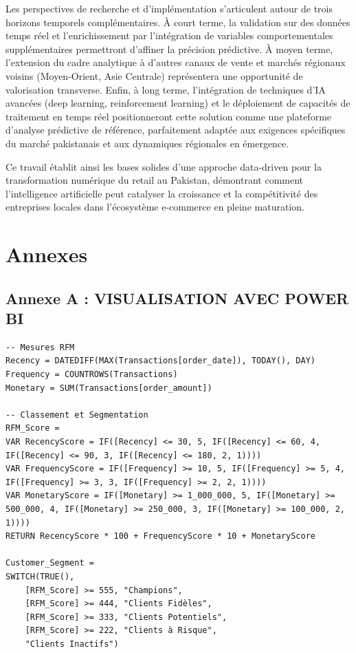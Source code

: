 \documentclass[a4paper,12pt]{article}
\begin{document}
Les perspectives de recherche et d'implémentation s'articulent autour de trois horizons temporels complémentaires. À court terme, la validation sur des données temps réel et l'enrichissement par l'intégration de variables comportementales supplémentaires permettront d'affiner la précision prédictive. À moyen terme, l'extension du cadre analytique à d'autres canaux de vente et marchés régionaux voisins (Moyen-Orient, Asie Centrale) représentera une opportunité de valorisation transverse. Enfin, à long terme, l'intégration de techniques d'IA avancées (deep learning, reinforcement learning) et le déploiement de capacités de traitement en temps réel positionneront cette solution comme une plateforme d'analyse prédictive de référence, parfaitement adaptée aux exigences spécifiques du marché pakistanais et aux dynamiques régionales en émergence.

Ce travail établit ainsi les bases solides d'une approche data-driven pour la transformation numérique du retail au Pakistan, démontrant comment l'intelligence artificielle peut catalyser la croissance et la compétitivité des entreprises locales dans l'écosystème e-commerce en pleine maturation.
\chapter*{Annexes}

\section*{Annexe A : VISUALISATION AVEC POWER BI}

\begin{lstlisting}[style=pythonstyle, caption={Mesure DAX principale}]
-- Mesures RFM
Recency = DATEDIFF(MAX(Transactions[order_date]), TODAY(), DAY)
Frequency = COUNTROWS(Transactions)
Monetary = SUM(Transactions[order_amount])

-- Classement et Segmentation
RFM_Score = 
VAR RecencyScore = IF([Recency] <= 30, 5, IF([Recency] <= 60, 4, IF([Recency] <= 90, 3, IF([Recency] <= 180, 2, 1))))
VAR FrequencyScore = IF([Frequency] >= 10, 5, IF([Frequency] >= 5, 4, IF([Frequency] >= 3, 3, IF([Frequency] >= 2, 2, 1))))
VAR MonetaryScore = IF([Monetary] >= 1_000_000, 5, IF([Monetary] >= 500_000, 4, IF([Monetary] >= 250_000, 3, IF([Monetary] >= 100_000, 2, 1))))
RETURN RecencyScore * 100 + FrequencyScore * 10 + MonetaryScore

Customer_Segment = 
SWITCH(TRUE(),
    [RFM_Score] >= 555, "Champions",
    [RFM_Score] >= 444, "Clients Fidèles",
    [RFM_Score] >= 333, "Clients Potentiels",
    [RFM_Score] >= 222, "Clients à Risque",
    "Clients Inactifs")



\end{lstlisting}
\newpage
\end{document}
